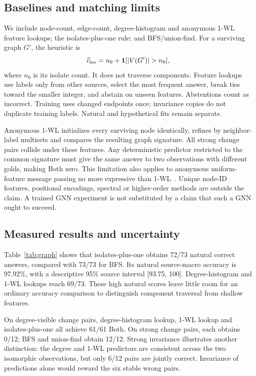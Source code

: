 \documentclass[10pt,twocolumn,letterpaper]{article}
\begin{document}
\subsection{Baselines and matching limits}
We include node-count, edge-count, degree-histogram and anonymous
1-WL feature lookups; the isolates-plus-one rule; and BFS/union-find.
For a surviving graph $G'$, the heuristic is
\begin{equation}
\widehat c_{\rm iso}=n_0+\mathbf{1}[|V(G')|>n_0],
\end{equation}
where $n_0$ is its isolate count. It does not traverse components.
Feature lookups use labels only from other sources, select the most
frequent answer, break ties toward the smaller integer, and abstain
on unseen features. Abstentions count as incorrect. Training uses
changed endpoints once; invariance copies do not duplicate training
labels. Natural and hypothetical fits remain separate.

Anonymous 1-WL initializes every surviving node identically, refines
by neighbor-label multisets and compares the resulting graph signature.
All strong change pairs collide under these features. Any deterministic
predictor restricted to the common signature must give the same
answer to two observations with different golds, making Both zero.
This limitation also applies to anonymous uniform-feature message
passing no more expressive than 1-WL~\cite{xu2019gnn}. Unique node-ID
features, positional encodings, spectral or higher-order methods are
outside the claim. A trained GNN experiment is not substituted by a
claim that such a GNN ought to succeed.

\subsection{Measured results and uncertainty}
Table~\ref{tab:graph} shows that isolates-plus-one obtains 72/73 natural
correct answers, compared with 73/73 for BFS. Its natural source-macro
accuracy is 97.92\%, with a descriptive 95\% source interval
[93.75, 100]. Degree-histogram and 1-WL lookups reach 69/73.
These high natural scores leave little room for an ordinary accuracy
comparison to distinguish component traversal from shallow features.

On degree-visible change pairs, degree-histogram lookup, 1-WL lookup
and isolates-plus-one all achieve 61/61 Both. On strong change pairs,
each obtains 0/12; BFS and union-find obtain 12/12.
Strong invariance illustrates another distinction: the degree and
1-WL predictors are consistent across the two isomorphic observations,
but only 6/12 pairs are jointly correct. Invariance of predictions
alone would reward the six stable wrong pairs.
\end{document}

